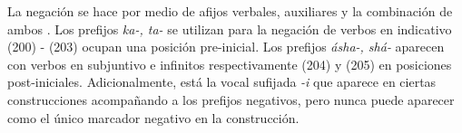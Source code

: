 La negación se hace por medio de afijos verbales, auxiliares y la combinación de ambos \textcolor{MidnightBlue}{\citep{fwe}}. Los prefijos {\setmainfont{Charis SIL} \textit{ka-, ta-}} se utilizan para la negación de verbos en indicativo (200) - (203) ocupan una posición pre-inicial. Los prefijos {\setmainfont{Charis SIL} \textit{ásha-, shá-}} aparecen con verbos en subjuntivo e infinitos respectivamente (204) y (205) en posiciones post-iniciales. Adicionalmente, está la vocal sufijada {\setmainfont{Charis SIL} \textit{-i}} que aparece en ciertas construcciones acompañando a los prefijos negativos, pero nunca puede aparecer como el único marcador negativo en la construcción. 